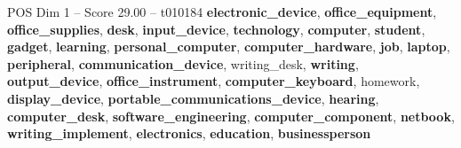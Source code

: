 \begin{textsample}{POS Dim 1 – Score 29.00 – t010184}  \label{ex:f1_pos_018}
\textbf{electronic\_device}, \textbf{office\_equipment}, \textbf{office\_supplies}, \textbf{desk}, \textbf{input\_device}, \textbf{technology}, \textbf{computer}, \textbf{student}, \textbf{gadget}, \textbf{learning}, \textbf{personal\_computer}, \textbf{computer\_hardware}, \textbf{job}, \textbf{laptop}, \textbf{peripheral}, \textbf{communication\_device}, writing\_desk, \textbf{writing}, \textbf{output\_device}, \textbf{office\_instrument}, \textbf{computer\_keyboard}, homework, \textbf{display\_device}, \textbf{portable\_communications\_device}, \textbf{hearing}, \textbf{computer\_desk}, \textbf{software\_engineering}, \textbf{computer\_component}, \textbf{netbook}, \textbf{writing\_implement}, \textbf{electronics}, \textbf{education}, \textbf{businessperson}

\end{textsample}
